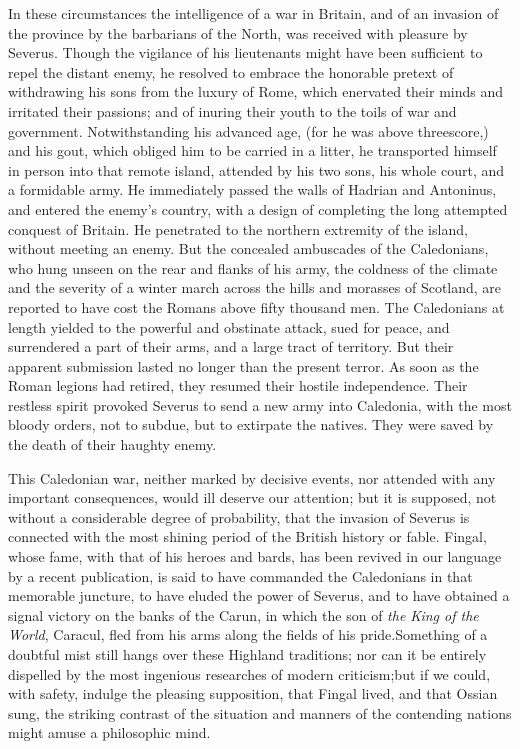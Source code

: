 In these circumstances the intelligence of a war in Britain, and
of an invasion of the province by the barbarians of the North,
was received with pleasure by Severus. Though the vigilance of
his lieutenants might have been sufficient to repel the distant
enemy, he resolved to embrace the honorable pretext of
withdrawing his sons from the luxury of Rome, which enervated
their minds and irritated their passions; and of inuring their
youth to the toils of war and government. Notwithstanding his
advanced age, (for he was above threescore,) and his gout, which
obliged him to be carried in a litter, he transported himself in
person into that remote island, attended by his two sons, his
whole court, and a formidable army. He immediately passed the
walls of Hadrian and Antoninus, and entered the enemy’s country,
with a design of completing the long attempted conquest of
Britain. He penetrated to the northern extremity of the island,
without meeting an enemy. But the concealed ambuscades of the
Caledonians, who hung unseen on the rear and flanks of his army,
the coldness of the climate and the severity of a winter march
across the hills and morasses of Scotland, are reported to have
cost the Romans above fifty thousand men. The Caledonians at
length yielded to the powerful and obstinate attack, sued for
peace, and surrendered a part of their arms, and a large tract of
territory. But their apparent submission lasted no longer than
the present terror. As soon as the Roman legions had retired,
they resumed their hostile independence. Their restless spirit
provoked Severus to send a new army into Caledonia, with the most
bloody orders, not to subdue, but to extirpate the natives. They
were saved by the death of their haughty enemy.\footnotemark[12]


This Caledonian war, neither marked by decisive events, nor
attended with any important consequences, would ill deserve our
attention; but it is supposed, not without a considerable degree
of probability, that the invasion of Severus is connected with
the most shining period of the British history or fable. Fingal,
whose fame, with that of his heroes and bards, has been revived
in our language by a recent publication, is said to have
commanded the Caledonians in that memorable juncture, to have
eluded the power of Severus, and to have obtained a signal
victory on the banks of the Carun, in which the son of \textit{the King
of the World}, Caracul, fled from his arms along the fields of
his pride.\footnotemark[13] Something of a doubtful mist still hangs over these
Highland traditions; nor can it be entirely dispelled by the most
ingenious researches of modern criticism;\footnotemark[14] but if we could,
with safety, indulge the pleasing supposition, that Fingal lived,
and that Ossian sung, the striking contrast of the situation and
manners of the contending nations might amuse a philosophic mind.

